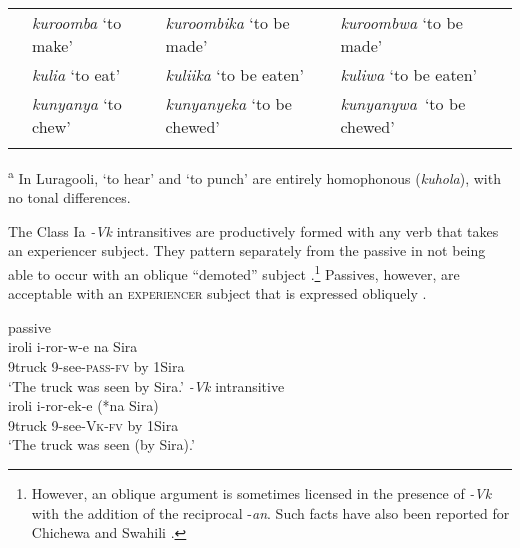 \documentclass[output=paper]{langsci/langscibook}
\begin{document}
\begin{table}
\begin{tabularx}{\textwidth}{lp{2.5cm}XX}
\tablevspace & \textit{kuroomba} \newline ‘to make’ & \textit{kuroombika} \newline ‘to be made’ & \textit{kuroombwa} \newline ‘to be made’\\
\tablevspace & \textit{kulia} \newline ‘to eat’ & \textit{kuliika} \newline ‘to be eaten’ & \textit{kuliwa} \newline ‘to be eaten’\\
\tablevspace & \textit{kunyanya} \newline ‘to chew’ & \textit{kunyanyeka} \newline ‘to be chewed’ & \textit{kunyanywa}~\newline ‘to be chewed’\\ 
\lspbottomrule
\end{tabularx}
\textsuperscript{a} In Luragooli, ‘to hear’ and ‘to punch’ are entirely homophonous (\textit{kuhola}), with no tonal differences.

\end{table}

The Class Ia \textit{-Vk} intransitives are productively formed with any verb that takes an experiencer subject. They pattern separately from the passive in not being able to occur with an oblique “demoted” subject .\footnote{However, an oblique argument is sometimes licensed in the presence of \textit{-Vk} with the addition of the reciprocal -\textit{an}. Such facts have also been reported for Chichewa and Swahili \citep{Dubinsky1996,SeidlDimitriadis2003}.} Passives, however, are acceptable with an \textsc{experiencer} subject that is expressed obliquely .

\ea\label{ex:gluckman:18}
  \ea \label{ex:gluckman:18a}
  {{passive}}\\
  \gll iroli      i-ror-w-e         na Sira\\
      9truck  9-see-\textsc{pass-fv} by 1Sira\\
  \glt ‘The truck was seen by Sira.’ 
  \ex\label{ex:gluckman:18b}
  {{\textit{-Vk}}{ intransitive}}\\
  \gll iroli    i-ror-ek-e       (*na Sira)\\
      9truck 9-see-\textsc{Vk}\textsc{-}\textsc{fv}   \hphantom{(*}by 1Sira\\
  \glt ‘The truck was seen (by Sira).’
  \z
\z
\end{document}
